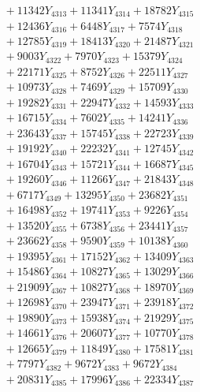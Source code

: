 \documentclass[a4paper,10pt]{article}
\begin{document}
{\begin{align}
&\;  + 11342 Y_{4313} + 11341 Y_{4314} + 18782 Y_{4315} \\[0.3ex]
&\;  + 12436 Y_{4316} + 6448 Y_{4317} + 7574 Y_{4318} \\[0.5ex]\allowbreak
&\;  + 12785 Y_{4319} + 18413 Y_{4320} + 21487 Y_{4321} \\[0.3ex]
&\;  + 9003 Y_{4322} + 7970 Y_{4323} + 15379 Y_{4324} \\[0.3ex]
&\;  + 22171 Y_{4325} + 8752 Y_{4326} + 22511 Y_{4327} \\[0.3ex]
&\;  + 10973 Y_{4328} + 7469 Y_{4329} + 15709 Y_{4330} \\[0.3ex]
&\;  + 19282 Y_{4331} + 22947 Y_{4332} + 14593 Y_{4333} \\[0.3ex]
&\;  + 16715 Y_{4334} + 7602 Y_{4335} + 14241 Y_{4336} \\[0.3ex]
&\;  + 23643 Y_{4337} + 15745 Y_{4338} + 22723 Y_{4339} \\[0.3ex]
&\;  + 19192 Y_{4340} + 22232 Y_{4341} + 12745 Y_{4342} \\[0.3ex]
&\;  + 16704 Y_{4343} + 15721 Y_{4344} + 16687 Y_{4345} \\[0.3ex]
&\;  + 19260 Y_{4346} + 11266 Y_{4347} + 21843 Y_{4348} \\[0.5ex]\allowbreak
&\;  + 6717 Y_{4349} + 13295 Y_{4350} + 23682 Y_{4351} \\[0.3ex]
&\;  + 16498 Y_{4352} + 19741 Y_{4353} + 9226 Y_{4354} \\[0.3ex]
&\;  + 13520 Y_{4355} + 6738 Y_{4356} + 23441 Y_{4357} \\[0.3ex]
&\;  + 23662 Y_{4358} + 9590 Y_{4359} + 10138 Y_{4360} \\[0.3ex]
&\;  + 19395 Y_{4361} + 17152 Y_{4362} + 13409 Y_{4363} \\[0.3ex]
&\;  + 15486 Y_{4364} + 10827 Y_{4365} + 13029 Y_{4366} \\[0.3ex]
&\;  + 21909 Y_{4367} + 10827 Y_{4368} + 18970 Y_{4369} \\[0.3ex]
&\;  + 12698 Y_{4370} + 23947 Y_{4371} + 23918 Y_{4372} \\[0.3ex]
&\;  + 19890 Y_{4373} + 15938 Y_{4374} + 21929 Y_{4375} \\[0.3ex]
&\;  + 14661 Y_{4376} + 20607 Y_{4377} + 10770 Y_{4378} \\[0.5ex]\allowbreak
&\;  + 12665 Y_{4379} + 11849 Y_{4380} + 17581 Y_{4381} \\[0.3ex]
&\;  + 7797 Y_{4382} + 9672 Y_{4383} + 9672 Y_{4384} \\[0.3ex]
&\;  + 20831 Y_{4385} + 17996 Y_{4386} + 22334 Y_{4387} \\[0.3ex]

\end{align}}
\end{document}
